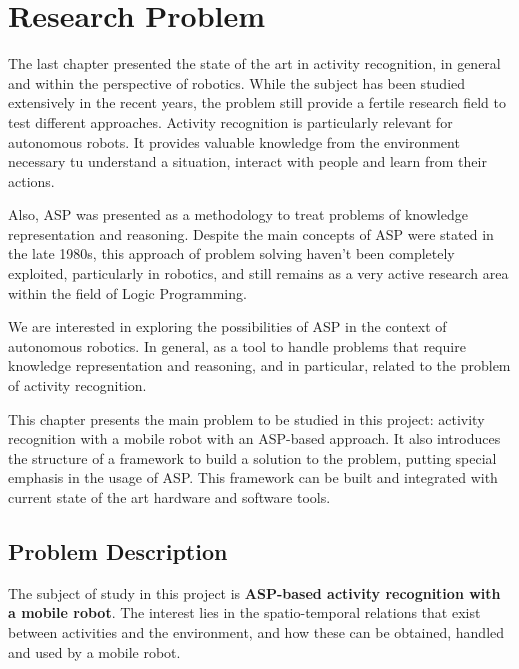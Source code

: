 \chapter{Research Problem} \label{ch_research_problem}

The last chapter presented the state of the art in activity recognition, in general and within the perspective of robotics.
While the subject has been studied extensively in the recent years, the problem still provide a fertile research field to test different approaches.
Activity recognition is particularly relevant for autonomous robots.
It provides valuable knowledge from the environment necessary tu understand a situation, interact with people and learn from their actions. 

Also, ASP was presented as a methodology to treat problems of knowledge representation and reasoning.
Despite the main concepts of ASP were stated in the late 1980s, this approach of problem solving haven't been completely exploited, particularly in robotics, and still remains as a very active research area within the field of Logic Programming.

We are interested in exploring the possibilities of ASP in the context of autonomous robotics.
In general, as a tool to handle problems that require knowledge representation and reasoning, and in particular, related to the problem of activity recognition.

This chapter presents the main problem to be studied in this project: activity recognition with a mobile robot with an ASP-based approach.
It also introduces the structure of a framework to build a solution to the problem, putting special emphasis in the usage of ASP.
This framework can be built and integrated with current state of the art hardware and software tools. 


\section{Problem Description} \label{sec_problem}

The subject of study in this project is \textbf{ASP-based activity recognition with a mobile robot}.
The interest lies in the spatio-temporal relations that exist between activities and the environment, and how these can be obtained, handled and used by a mobile robot.

